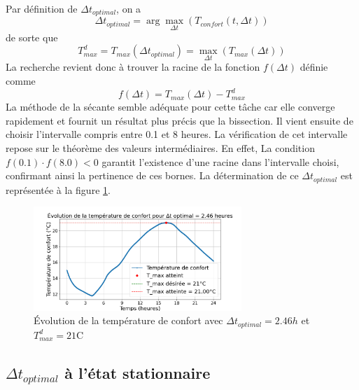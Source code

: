 \documentclass[12pt]{article}
\begin{document}
        Par définition de $\Delta t_{optimal}$, on a
        \begin{equation}
            \Delta t_{optimal} = \arg \max_{\Delta t} \left(T_{confort}(t, \Delta t) \right)
        \end{equation}
        de sorte que
        \begin{equation}
            T_{max}^d = T_{max}(\Delta t_{optimal}) = \max_{\Delta t} \left( T_{max}(\Delta t) \right)
        \end{equation}
        La recherche revient donc à trouver la racine de la fonction $f(\Delta t)$ définie comme
        \begin{equation}
            f(\Delta t) = T_{max}(\Delta t) - T_{max}^d
        \end{equation}
        La méthode de la sécante semble adéquate pour cette tâche car elle converge rapidement et fournit un résultat plus précis que la bissection. Il vient ensuite de choisir l'intervalle compris entre 0.1 et 8 heures. La vérification de cet intervalle repose sur le théorème des valeurs intermédiaires. En effet, La condition $f(0.1)\cdot f(8.0) < 0$ garantit l'existence d'une racine dans l'intervalle choisi, confirmant ainsi la pertinence de ces bornes.
        La détermination de ce $\Delta t_{optimal}$ est représentée à la figure \ref{fig:T_confort_optimal}.
        \begin{figure}
            \centering
            \includegraphics[width=0.70\textwidth]{Rapport/figures/T_confort_optimal.png}
            \caption{Évolution de la température de confort avec $\Delta t_{optimal} = 2.46h$ et $T_{max}^d = 21$\degree C}
            \label{fig:T_confort_optimal}
        \end{figure}
        
    \subsection{$\Delta t_{optimal}$ à l'état stationnaire}
        
\end{document}
